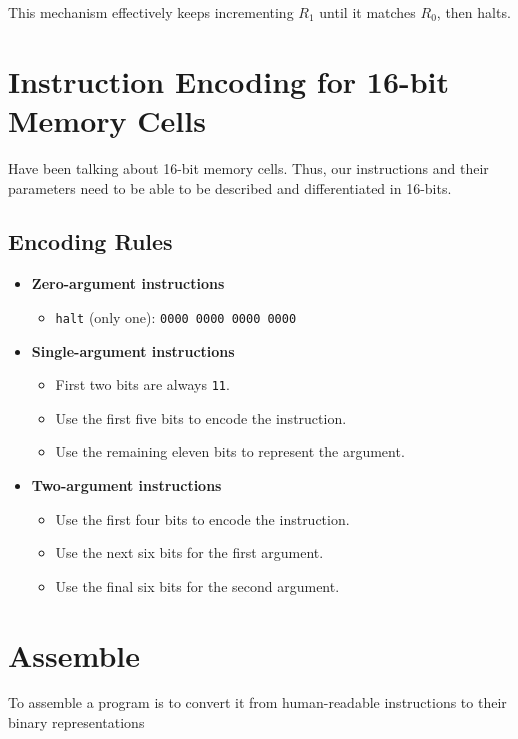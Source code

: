 \documentclass{report}
\begin{document}
This mechanism effectively keeps incrementing \(R_1\) until it matches \(R_0\),
then halts.

\section{Instruction Encoding for 16-bit Memory Cells}

Have been talking about 16-bit memory cells. Thus, our instructions and their parameters need to be able to be described and differentiated in 16-bits.

\subsection*{Encoding Rules}
\begin{itemize}
	\item \textbf{Zero-argument instructions}
	      \begin{itemize}
		      \item \texttt{halt} (only one): \texttt{0000 0000 0000 0000}
	      \end{itemize}

	\item \textbf{Single-argument instructions}
	      \begin{itemize}
		      \item First two bits are always \texttt{11}.
		      \item Use the first five bits to encode the instruction.
		      \item Use the remaining eleven bits to represent the argument.
	      \end{itemize}

	\item \textbf{Two-argument instructions}
	      \begin{itemize}
		      \item Use the first four bits to encode the instruction.
		      \item Use the next six bits for the first argument.
		      \item Use the final six bits for the second argument.
	      \end{itemize}
\end{itemize}

\section{Assemble}

To assemble a program is to convert it from human-readable instructions to
their binary representations
\end{document}
